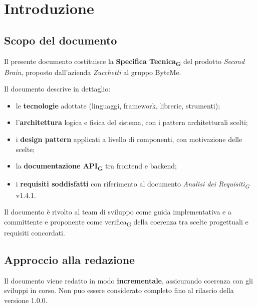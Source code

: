 \documentclass[11pt,a4paper]{article}
\newcommand{\gls}[1]{#1\textsubscript{G}}
\begin{document}
\tableofcontents
\thispagestyle{empty}
\newpage

\setcounter{page}{1}

\section{Introduzione}
\subsection{Scopo del documento}
Il presente documento costituisce la \textbf{\gls{Specifica Tecnica}} del prodotto
\textit{Second Brain}, proposto dall'azienda \textit{Zucchetti} al
gruppo ByteMe.
 
Il documento descrive in dettaglio:
\begin{itemize}
  \item le \textbf{tecnologie} adottate (linguaggi, framework, librerie, strumenti);
  \item l'\textbf{architettura} logica e fisica del sistema, con i pattern architetturali scelti;
  \item i \textbf{design pattern} applicati a livello di componenti, con motivazione delle scelte;
  \item la \textbf{documentazione \gls{API}} tra frontend e backend;
  \item i \textbf{requisiti soddisfatti} con riferimento al documento \textit{\gls{Analisi dei Requisiti}} v1.4.1.
\end{itemize}
 
Il documento è rivolto al team di sviluppo come guida implementativa e a
committente e proponente come \gls{verifica} della coerenza tra scelte progettuali e requisiti concordati.
 
\subsection{Approccio alla redazione}
Il documento viene redatto in modo \textbf{incrementale}, assicurando coerenza con gli sviluppi in corso. Non puo essere considerato completo fino al rilascio della versione 1.0.0.
\end{document}
